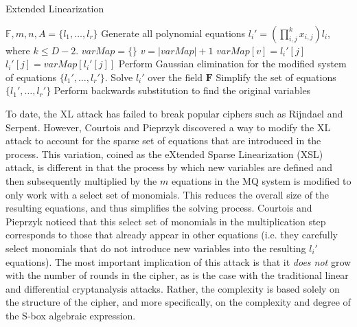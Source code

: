 \begin{algorithm}[t!] %
\caption{Extended Linearization} \label{alg:xl}
\begin{algorithmic}[1]
\Require $\mathbb{F}, m, n, A = \{l_1,\dots,l_r\}$
\State Generate all polynomial equations $l_i' = \left(\prod_{i,j}^k x_{i,j}\right) l_i$, where $k \leq D - 2$. 
\State $varMap = \{\}$
	 
			\State $v = |varMap| + 1$ 
			\State $varMap[v] = l_i'[j]$
		\EndIf
		\State $l_i'[j] = varMap[l_i'[j]]$ 
	\EndFor
\EndFor
\State Perform Gaussian elimination for the modified system of equations $\{l_1',\dots,l_r'\}$.
	\State Solve $l_i'$ over the field $\mathbf{F}$
	\State Simplify the set of equations $\{l_1',\dots,l_r'\}$
\EndWhile
\State Perform backwards substitution to find the original variables
\end{algorithmic}
\end{algorithm}

To date, the XL attack has failed to break popular ciphers such as Rijndael and Serpent. However, Courtois and Pieprzyk \cite{Courtois02-1} discovered a way to modify the XL attack to account for the sparse set of equations that are introduced in the process. This variation, coined as the eXtended Sparse Linearization (XSL) attack, is different in that the process by which new variables are defined and then subsequently multiplied by the $m$ equations in the MQ system is modified to only work with a select set of monomials. This reduces the overall size of the resulting equations, and thus simplifies the solving process. Courtois and Pieprzyk noticed that this select set of monomials in the multiplication step corresponds to those that already appear in other equations (i.e. they carefully select monomials that do not introduce new variables into the resulting $l_i'$ equations). The most important implication of this attack is that it \emph{does not} grow with the number of rounds in the cipher, as is the case with the traditional linear and differential cryptanalysis attacks. Rather, the complexity is based solely on the structure of the cipher, and more specifically, on the complexity and degree of the S-box algebraic expression.


